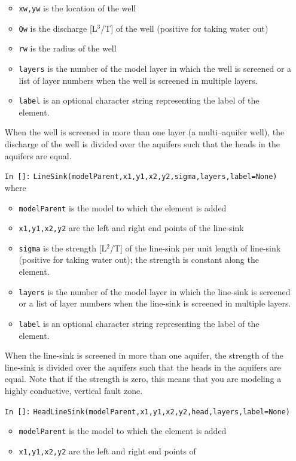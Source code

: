 \documentclass [10pt,letterpaper] {article}
\begin{document}
\begin{itemize}
\begin{itemize}
    \item {\tt xw,yw} is the location of the well
    \item {\tt Qw} is the discharge [L$^3$/T] of the well (positive for
    taking water out)
    \item {\tt rw} is the radius of the well
    \item {\tt layers} is the number of the model layer in which the well is screened or a list of layer numbers when the well is screened in multiple layers. 
    \item {\tt label} is an optional character string representing the label of the element.
    \end{itemize}
    When the well is screened in more than one layer (a multi--aquifer well), the
    discharge of the well is divided over the aquifers such that
    the heads in the aquifers are equal.
\item[{\tt In []:}] {\tt LineSink(modelParent,x1,y1,x2,y2,sigma,layers,label=None)} where
    \begin{itemize}
    \item {\tt modelParent} is the model to which the element is
    added
    \item {\tt x1,y1,x2,y2} are the left and right end points of
    the line-sink
    \item {\tt sigma} is the strength [L$^2$/T] of the line-sink per unit length
    of line-sink (positive for taking water out); the strength is constant
    along the element.
    \item {\tt layers} is the number of the model layer in which the line-sink is screened or a list of layer numbers when the line-sink is screened in multiple layers. 
    \item {\tt label} is an optional character string representing the label of the element.
    \end{itemize}
    When the line-sink is screened in more than one aquifer, the
    strength of the line-sink is divided over the aquifers such that
    the heads in the aquifers are equal. Note that if the strength is zero, this means that
    you are modeling a highly conductive, vertical fault zone.
\item[{\tt In []:}] {\tt HeadLineSink(modelParent,x1,y1,x2,y2,head,layers,label=None)}
    \begin{itemize}
    \item {\tt modelParent} is the model to which the element is
    added
    \item {\tt x1,y1,x2,y2} are the left and right end points of

\end{itemize}
\end{itemize}
\end{document}
